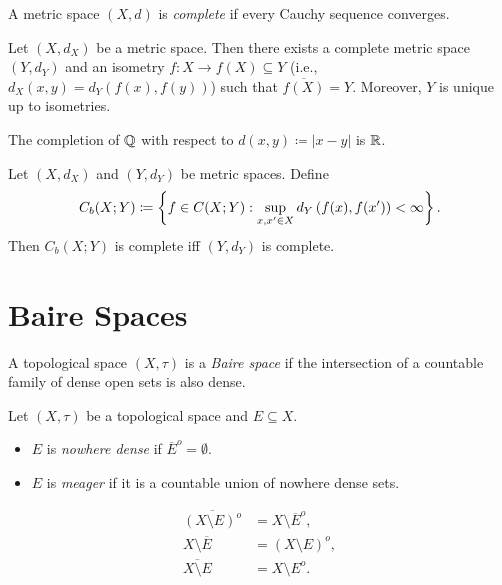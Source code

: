 \documentclass[screen,single]{techreport}
\numberwithin{equation}{section}
\begin{document}
\begin{definition}\label{De:CompleteMetric}
  A metric space $(X,d)$ is \emph{complete} if every Cauchy sequence converges.
\end{definition}

\begin{theorem}\label{De:MetricSpaceCompletion}
  Let $(X,d_X)$ be a metric space.
  Then there exists a complete metric space $(Y,d_Y)$ and an isometry $f : X \to f(X) \subseteq Y$ (i.e., $d_X(x,y) = d_Y(f(x),f(y))$) such that $\overline{f(X)} = Y$.
  Moreover, $Y$ is unique up to isometries.
\end{theorem}

\begin{remark}\label{Rem:CompletionOfQIsR}
  The completion of $\mathbb{Q}$ with respect to $d(x,y) \coloneqq |x-y|$ is $\mathbb{R}$.
\end{remark}

\begin{proposition}\label{Prop:BoundedFunctionSpaceCompeteIffRangeComplete}
  Let $(X,d_X)$ and $(Y,d_Y)$ be metric spaces.
  Define
  \[
  C_b(X;Y) \coloneqq \left\{ { f \in C(X;Y) : \sup_{x,x' \in X} d_Y\left({ f(x), f(x') }\right) < \infty } \right\}.
  \]
  Then $C_b(X;Y)$ is complete iff $(Y,d_Y)$ is complete.
\end{proposition}

\section{Baire Spaces}

\begin{definition}\label{De:BaireSpace}
  A topological space $(X,\tau)$ is a \emph{Baire space} if the intersection of a countable family of dense open sets is also dense.
\end{definition}

\begin{definition}\label{De:NowhereDenseAndMeager}
  Let $(X,\tau)$ be a topological space and $E \subseteq X$.
  \begin{itemize}
    \item $E$ is \emph{nowhere dense} if $\overline{E}^o = \emptyset$.
    \item $E$ is \emph{meager} if it is a countable union of nowhere dense sets.
  \end{itemize}
\end{definition}

\begin{remark}\label{Rem:SeveralClosIntEqulities}
  \begin{align*}
    \overline{(X \setminus E)^o} & = X \setminus \overline{E}^o, \\
    X \setminus \overline{E} & = (X \setminus E)^o, \\
    \overline{X \setminus E} & = X \setminus E^o.
  \end{align*}
\end{remark}
\end{document}
